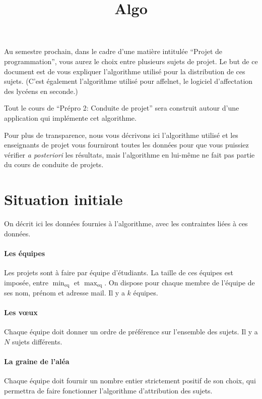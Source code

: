 \documentclass{article}
\title{Algo}
\newcommand{\mineq}{\min_{\text{eq}}\xspace}
\newcommand{\maxeq}{\max_{\text{eq}}\xspace}
\newcommand{\nproj}{N}
\newcommand{\nbeq}{k}
\begin{document}
\maketitle

Au semestre prochain, dans le cadre d'une mati\`ere intitul\'ee
``Projet de programmation'', vous aurez le choix entre plusieurs
sujets de projet. Le but de ce document est de vous expliquer
l'algorithme utilis\'e pour la distribution de ces sujets. (C'est
\'egalement l'algorithme utilis\'e pour affelnet, le logiciel
d'affectation des lyc\'eens en seconde.)

Tout le cours de ``Pr\'epro 2: Conduite de projet'' sera construit
autour d'une application qui impl\'emente cet algorithme.

Pour plus de transparence, nous vous d\'ecrivons ici l'algorithme
utilis\'e et les enseignants de projet vous fourniront toutes les
donn\'ees pour que vous puissiez v\'erifier \emph{a posteriori\/} les
r\'esultats, mais l'algorithme en lui-m\^eme ne fait pas partie du
cours de conduite de projets.

\section{Situation initiale}
On d\'ecrit ici les donn\'ees fournies \`a l'algorithme, avec les
contraintes li\'ees \`a ces donn\'ees.
\paragraph{Les \'equipes}
Les projets sont \`a faire par \'equipe d'\'etudiants. La taille de
ces \'equipes est impos\'ee, entre \(\mineq\) et \(\maxeq\). On
dispose pour chaque membre de l'\'equipe de ses nom, pr\'enom et
adresse mail. Il y a \(\nbeq\) \'equipes.

\paragraph{Les v\oe ux}
Chaque \'equipe doit donner un ordre de pr\'ef\'erence sur l'ensemble
des sujets. Il y a \(\nproj\) sujets diff\'erents.

\paragraph{La graine de l'al\'ea}
Chaque \'equipe doit fournir un nombre entier strictement positif de
son choix, qui permettra de faire fonctionner l'algorithme
d'attribution des sujets.
\end{document}
